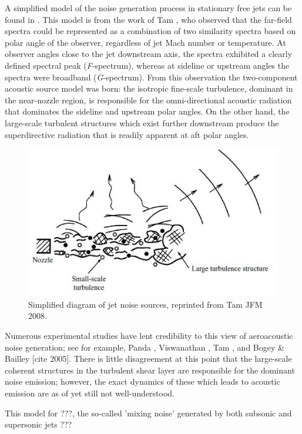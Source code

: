 A simplified model of the noise generation process in stationary free jets can be found in . 
This model is from the work of Tam \etal \citep{Tam1996, Tam2008}, who observed that the far-field spectra could be represented as a combination of two similarity spectra based on polar angle of the observer, regardless of jet Mach number or temperature.
At observer angles close to the jet downstream axis, the spectra exhibited a clearly defined spectral peak (\emph{F}-spectrum), whereas at sideline or upstream angles the spectra were broadband (\emph{G}-spectrum).
From this observation the two-component acoustic source model was born: the isotropic fine-scale turbulence, dominant in the near-nozzle region, is responsible for the omni-directional acoustic radiation that dominates the sideline and upstream polar angles. 
On the other hand, the large-scale turbulent structures which exist further downstream produce the superdirective radiation that is readily apparent at aft polar angles. 
\begin{figure}
	\centering
	\includegraphics[width=5in]{Figures/JetNoiseSourceDiagramTMP.jpg}
	\caption{Simplified diagram of jet noise sources, reprinted from Tam \etal JFM 2008.}
	\label{fig:jet_sources_diagram}
\end{figure}
Numerous experimental studies have lent credibility to this view of aeroacoustic noise generation; see for example, Panda \etal [cite], Viswanathan \etal [cite], Tam \etal [cite], and Bogey \& Bailley [cite 2005].
There is little disagreement at this point that the large-scale coherent structures in the turbulent shear layer are responsible for the dominant noise emission; however, the exact dynamics of these which leads to acoustic emission are as of yet still not well-understood. 

This model for ???, the so-called 'mixing noise' generated by both subsonic and supersonic jets ???

